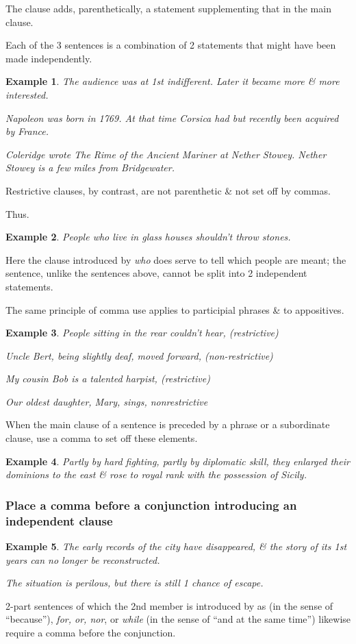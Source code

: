 \documentclass{article}
\newtheorem{example}{Example}
\begin{document}
The clause adds, parenthetically, a statement supplementing that in the main clause.

Each of the 3 sentences is a combination of 2 statements that might have been made independently.
\begin{example}
	The audience was at 1st indifferent. Later it became more \& more interested.
	
	Napoleon was born in 1769. At that time Corsica had but recently been acquired by France.
	
	Coleridge wrote The Rime of the Ancient Mariner at Nether Stowey. Nether Stowey is a few miles from Bridgewater.
\end{example}
Restrictive clauses, by contrast, are not parenthetic \& not set off by commas.

Thus.
\begin{example}
	People who live in glass houses shouldn't throw stones.
\end{example}
Here the clause introduced by {\it who} does serve to tell which people are meant; the sentence, unlike the sentences above, cannot be split into 2 independent statements.

The same principle of comma use applies to participial phrases \& to appositives.
\begin{example}
	People sitting in the rear couldn't hear, \emph{(restrictive)}
	
	Uncle Bert, being slightly deaf, moved forward, \emph{(non-restrictive)}
	
	My cousin Bob is a talented harpist, \emph{(restrictive)}
	
	Our oldest daughter, Mary, sings, \emph{nonrestrictive}
\end{example}
When the main clause of a sentence is preceded by a phrase or a subordinate clause, use a comma to set off these elements.
\begin{example}
	Partly by hard fighting, partly by diplomatic skill, they enlarged their dominions to the east \& rose to royal rank with the possession of Sicily.
\end{example}


\subsubsection{Place a comma before a conjunction introducing an independent clause}
\begin{example}
	The early records of the city have disappeared, \& the story of its 1st years can no longer be reconstructed.
	
	The situation is perilous, but there is still 1 chance of escape.
\end{example}
2-part sentences of which the 2nd member is introduced by as (in the sense of ``because''), {\it for, or, nor}, or {\it while} (in the sense of ``and at the same time'') likewise require a comma before the conjunction.
\end{document}
